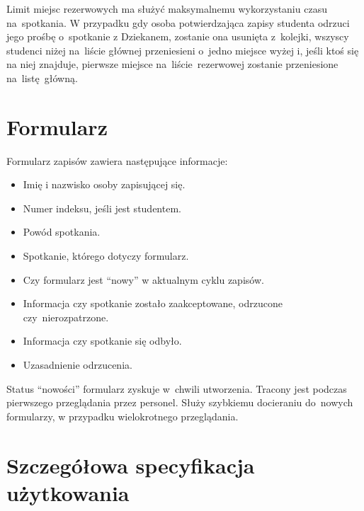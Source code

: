 \documentclass[licencjacka]{pracamgr}
\begin{document}
Limit miejsc rezerwowych ma służyć maksymalnemu wykorzystaniu czasu na~spotkania. W przypadku gdy osoba potwierdzająca zapisy studenta odrzuci jego prośbę o~spotkanie z Dziekanem, zostanie ona usunięta z~kolejki, wszyscy studenci niżej na~liście głównej przeniesieni o~jedno miejsce wyżej i, jeśli ktoś się na niej znajduje, pierwsze miejsce na~liście~rezerwowej zostanie przeniesione na~listę~główną.


\section{Formularz}
Formularz zapisów zawiera następujące informacje:

\begin{itemize}
\setlength\itemsep{0,05em}
    \item Imię i nazwisko osoby zapisującej się.
    \item Numer indeksu, jeśli jest studentem.
    \item Powód spotkania.
    \item Spotkanie, którego dotyczy formularz.
    \item Czy formularz jest “nowy” w aktualnym cyklu zapisów.
    \item Informacja czy spotkanie zostało zaakceptowane, odrzucone czy~nierozpatrzone.
    \item Informacja czy spotkanie się odbyło.
    \item Uzasadnienie odrzucenia.
\end{itemize}
Status “nowości” formularz zyskuje w~chwili utworzenia. Tracony jest podczas pierwszego przeglądania przez personel. Służy szybkiemu docieraniu do~nowych formularzy, w przypadku wielokrotnego przeglądania.

\section{Szczegółowa specyfikacja użytkowania}
\end{document}
